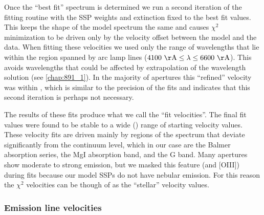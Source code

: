 
Once the ``best fit'' spectrum is determined we run a second iteration
of the fitting routine with the SSP weights and extinction fixed to
the best fit values. This keeps the shape of the model spectrum the
same and causes $\chi^2$ minimization to be driven only by the
velocity offset between the model and the data. When fitting these
velocities we used only the range of wavelengths that lie within the
region spanned by arc lamp lines ($\val{4100}{\AA} \leq\lambda\leq
\val{6600}{\AA}$). This avoids wavelengths that could be affected by
extrapolation of the wavelength solution (see
\ref{chap:891_1}). In the majority of apertures this
``refined'' velocity was within , which is similar
to the precision of the fits and indicates that this second iteration
is perhaps not necessary.


The results of these fits produce what we call the ``fit
velocities''. The final fit values were found to be stable to a wide
() range of starting velocity values. These
velocity fits are driven mainly by regions of the spectrum that
deviate significantly from the continuum level, which in our case are
the Balmer absorption series, the MgI absorption band, and the G
band. Many apertures show moderate to strong \Ha emission, but we
masked this feature (and [OIII]) during fits because our model SSPs do
not have nebular emission. For this reason the $\chi^2$ velocities can
be though of as the ``stellar'' velocity values.



\subsubsection{Emission line velocities}

